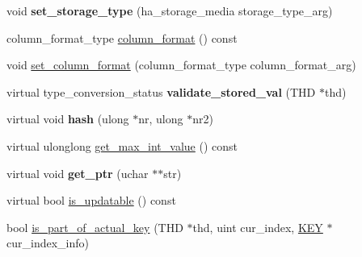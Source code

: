 \begin{DoxyCompactItemize}
void {\bfseries set\+\_\+storage\+\_\+type} (ha\+\_\+storage\+\_\+media storage\+\_\+type\+\_\+arg)
\item 
column\+\_\+format\+\_\+type \mbox{\hyperlink{classField_ab8a7853dafbd9a186aada119267de2ce}{column\+\_\+format}} () const
\item 
void \mbox{\hyperlink{classField_afa4ad98d3d0040bb28990c95caa0d86c}{set\+\_\+column\+\_\+format}} (column\+\_\+format\+\_\+type column\+\_\+format\+\_\+arg)
\item 
\mbox{\label{classField_a2ec579f3ad8a5f545e27d9395de06940}} 
virtual type\+\_\+conversion\+\_\+status {\bfseries validate\+\_\+stored\+\_\+val} (T\+HD $\ast$thd)
\item 
\mbox{\label{classField_ae74c2570797ba35360af0ba3ae79d498}} 
virtual void {\bfseries hash} (ulong $\ast$nr, ulong $\ast$nr2)
\item 
virtual ulonglong \mbox{\hyperlink{classField_a22f18fbe3224a5ac4f23a90523b09087}{get\+\_\+max\+\_\+int\+\_\+value}} () const
\item 
\mbox{\label{classField_a0cf990caf97b426428cbcbec528d50a1}} 
virtual void {\bfseries get\+\_\+ptr} (uchar $\ast$$\ast$str)
\item 
virtual bool \mbox{\hyperlink{classField_a8b2061753bd4314da3955b7500119907}{is\+\_\+updatable}} () const
\item 
bool \mbox{\hyperlink{classField_a5dcbbd073c69c9ec78ae71607125c876}{is\+\_\+part\+\_\+of\+\_\+actual\+\_\+key}} (T\+HD $\ast$thd, uint cur\+\_\+index, \mbox{\hyperlink{structst__key}{K\+EY}} $\ast$cur\+\_\+index\+\_\+info)
\end{DoxyCompactItemize}

